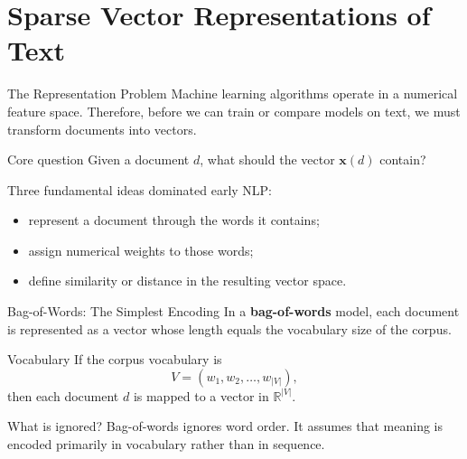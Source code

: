 \documentclass[aspectratio=169]{beamer}
\newcommand{\vect}[1]{\bm{#1}}
\newcommand{\R}{\mathbb{R}}
\begin{document}
\section{Sparse Vector Representations of Text}
%
\begin{frame}{The Representation Problem}
Machine learning algorithms operate in a numerical feature space. Therefore, before we can train or compare models on text, we must transform documents into vectors.

\vspace{0.15cm}
\begin{block}{Core question}
Given a document $d$, what should the vector $\vect{x}(d)$ contain?
\end{block}

\vspace{0.15cm}
Three fundamental ideas dominated early NLP:
\begin{itemize}
    \item represent a document through the words it contains;
    \item assign numerical weights to those words;
    \item define similarity or distance in the resulting vector space.
\end{itemize}
\end{frame}
%
%
\begin{frame}{Bag-of-Words: The Simplest Encoding}
In a \textbf{bag-of-words} model, each document is represented as a vector whose length equals the vocabulary size of the corpus.

\vspace{0.15cm}
\begin{block}{Vocabulary}
If the corpus vocabulary is
\[
V = (w_1,w_2,\dots,w_{|V|}),
\]
then each document $d$ is mapped to a vector in $\R^{|V|}$.
\end{block}

\vspace{0.1cm}
\begin{alertblock}{What is ignored?}
Bag-of-words ignores word order. It assumes that meaning is encoded primarily in vocabulary rather than in sequence.
\end{alertblock}
\end{frame}
%
%
\end{document}
